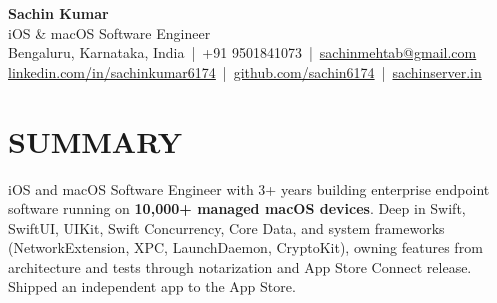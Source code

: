 \documentclass[letterpaper,10pt]{article}
\begin{document}
\begin{center}
{\Huge \textbf{Sachin Kumar}} \\ \vspace{3pt}
{\large iOS \& macOS Software Engineer} \\ \vspace{4pt}
\small
Bengaluru, Karnataka, India \,|\, +91 9501841073 \,|\,
\href{mailto:sachinmehtab@gmail.com}{sachinmehtab@gmail.com} \\ \vspace{1pt}
\href{https://linkedin.com/in/sachinkumar6174}{linkedin.com/in/sachinkumar6174} \,|\,
\href{https://github.com/sachin6174}{github.com/sachin6174} \,|\,
\href{https://www.sachinserver.in}{sachinserver.in}
\end{center}

\vspace{-5pt}

\section{SUMMARY}
\vspace{2pt}
\small iOS and macOS Software Engineer with 3+ years building enterprise endpoint software running on \textbf{10,000+ managed macOS devices}. Deep in Swift, SwiftUI, UIKit, Swift Concurrency, Core Data, and system frameworks (NetworkExtension, XPC, LaunchDaemon, CryptoKit), owning features from architecture and tests through notarization and App Store Connect release. Shipped an independent app to the App Store.

\vspace{-3pt}
\end{document}
